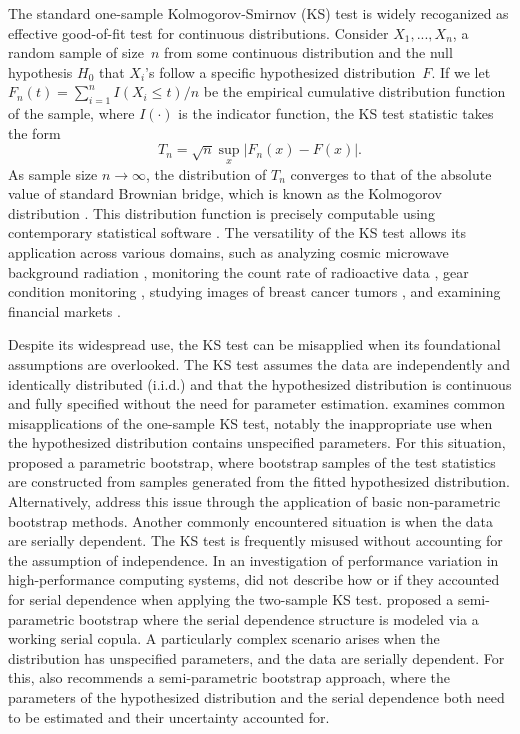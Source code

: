 \documentclass[12pt, titlepage, letterpaper]{article}
\begin{document}
{The standard one-sample Kolmogorov-Smirnov (KS) test is widely
recoganized as effective good-of-fit test for continuous distributions.
Consider $X_1, ..., X_n$, a random sample of size~$n$ from some continuous
distribution and the null hypothesis $H_0$ that $X_i$'s follow a specific
hypothesized distribution~$F$.
If we let $F_n(t) = \sum_{i=1}^n I(X_i \le t) / n$ be the empirical cumulative
distribution function of the sample, where $I(\cdot)$ is the indicator
function, the KS test statistic takes the form
\begin{equation}
  \label{eq:ks_standard}
  T_n = \sqrt{n} \sup_x | F_{n}(x) - F(x) |.
\end{equation}
As sample size $n\to \infty$, the distribution of $T_n$ converges to that of the
absolute value of standard Brownian bridge, which is known as the Kolmogorov
distribution \citep{stephens1974edf}. This distribution function is
precisely computable using contemporary statistical software
\citep{marsaglia2003evaluating}. The versatility of the KS test allows its
application across various domains, such as analyzing cosmic microwave
background radiation \citep{naess2012application}, monitoring the count rate of
radioactive data \citep{aslam2020introducing}, gear condition monitoring
\citep{andrade2001gear}, studying images of breast cancer tumors
\citep{demidenko2004kolmogorov}, and examining financial markets
\citep{lux2001turbulence}.


Despite its widespread use, the KS test can be 
misapplied when its foundational assumptions are overlooked. The KS test 
assumes the data are independently and identically distributed (i.i.d.) and 
that the hypothesized distribution is continuous and fully specified without 
the need for parameter estimation. \citet{zeimbekakis2022misuses} examines 
common misapplications of the one-sample KS test, notably the inappropriate
use when the hypothesized distribution contains unspecified parameters.
For this situation, \citet{zeimbekakis2022misuses} proposed a parametric
bootstrap, where bootstrap samples of the test statistics are constructed from
samples generated from the fitted hypothesized distribution.
Alternatively, \citet{babu2004goodness} address this issue through the
application of basic non-parametric bootstrap methods.
Another commonly encountered situation is when the data are serially
dependent. The KS test is frequently misused without accounting for the
assumption of independence. In an investigation of performance variation in
high-performance computing systems, \citet{tuncer2019ieee} did not describe
how or if they accounted for serial dependence when applying the two-sample
KS test.
\citet{zeimbekakis2022misuses} proposed a semi-parametric bootstrap
where the serial dependence structure is modeled via a working serial copula.
A particularly complex scenario arises when the distribution has unspecified
parameters, and the data are serially dependent. For this,
\citet{zeimbekakis2022misuses} also recommends a semi-parametric bootstrap
approach, where the parameters of the hypothesized distribution and the serial
dependence both need to be estimated and their uncertainty accounted for.


}
\end{document}
